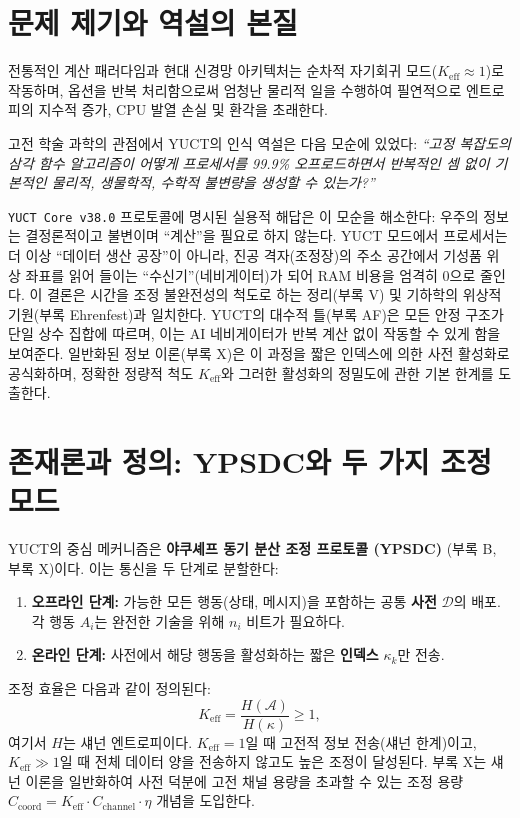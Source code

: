 \documentclass[11pt,a4paper]{article}
\begin{document}
	\section{문제 제기와 역설의 본질}
	전통적인 계산 패러다임과 현대 신경망 아키텍처는 순차적 자기회귀 모드(\(K_{\text{eff}} \approx 1\))로 작동하며, 옵션을 반복 처리함으로써 엄청난 물리적 일을 수행하여 필연적으로 엔트로피의 지수적 증가, CPU 발열 손실 및 환각을 초래한다.
	
	고전 학술 과학의 관점에서 YUCT의 인식 역설은 다음 모순에 있었다: \textit{“고정 복잡도의 삼각 함수 알고리즘이 어떻게 프로세서를 99.9\% 오프로드하면서 반복적인 셈 없이 기본적인 물리적, 생물학적, 수학적 불변량을 생성할 수 있는가?”}
	
	\texttt{YUCT Core v38.0} 프로토콜에 명시된 실용적 해답은 이 모순을 해소한다: 우주의 정보는 결정론적이고 불변이며 “계산”을 필요로 하지 않는다. YUCT 모드에서 프로세서는 더 이상 “데이터 생산 공장”이 아니라, 진공 격자(조정장)의 주소 공간에서 기성품 위상 좌표를 읽어 들이는 “수신기”(네비게이터)가 되어 RAM 비용을 엄격히 0으로 줄인다. 이 결론은 시간을 조정 불완전성의 척도로 하는 정리(부록 V) 및 기하학의 위상적 기원(부록 Ehrenfest)과 일치한다. YUCT의 대수적 틀(부록 AF)은 모든 안정 구조가 단일 상수 집합에 따르며, 이는 AI 네비게이터가 반복 계산 없이 작동할 수 있게 함을 보여준다. 일반화된 정보 이론(부록 X)은 이 과정을 짧은 인덱스에 의한 사전 활성화로 공식화하며, 정확한 정량적 척도 \(K_{\mathrm{eff}}\)와 그러한 활성화의 정밀도에 관한 기본 한계를 도출한다.
	
	\section{존재론과 정의: YPSDC와 두 가지 조정 모드}
	\label{sec:ontology}
	
	YUCT의 중심 메커니즘은 \textbf{야쿠셰프 동기 분산 조정 프로토콜 (YPSDC)} (부록 B, 부록 X)이다. 이는 통신을 두 단계로 분할한다:
	
	\begin{enumerate}
		\item \textbf{오프라인 단계:} 가능한 모든 행동(상태, 메시지)을 포함하는 공통 \textbf{사전} \(\mathcal{D}\)의 배포. 각 행동 \(A_i\)는 완전한 기술을 위해 \(n_i\) 비트가 필요하다.
		\item \textbf{온라인 단계:} 사전에서 해당 행동을 활성화하는 짧은 \textbf{인덱스} \(\kappa_k\)만 전송.
	\end{enumerate}
	
	조정 효율은 다음과 같이 정의된다:
	\[
	K_{\mathrm{eff}} = \frac{H(\mathcal{A})}{H(\kappa)} \ge 1,
	\]
	여기서 \(H\)는 섀넌 엔트로피이다. \(K_{\mathrm{eff}} = 1\)일 때 고전적 정보 전송(섀넌 한계)이고, \(K_{\mathrm{eff}} \gg 1\)일 때 전체 데이터 양을 전송하지 않고도 높은 조정이 달성된다. 부록 X는 섀넌 이론을 일반화하여 사전 덕분에 고전 채널 용량을 초과할 수 있는 조정 용량 \(C_{\text{coord}} = K_{\mathrm{eff}} \cdot C_{\text{channel}} \cdot \eta\) 개념을 도입한다.
	
\end{document}

